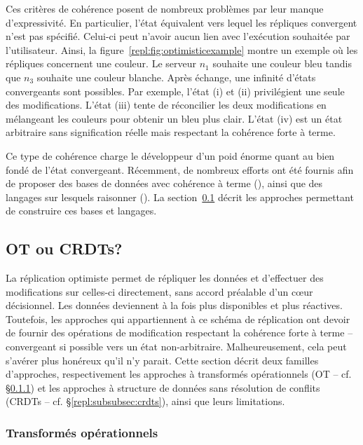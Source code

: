 Ces critères de cohérence posent de nombreux problèmes par leur manque
d'expressivité. En particulier, l'état équivalent vers lequel les répliques
convergent n'est pas spécifié. Celui-ci peut n'avoir aucun lien avec l'exécution
souhaitée par l'utilisateur. Ainsi, la figure~\ref{repl:fig:optimisticexample}
montre un exemple où les répliques concernent une couleur. Le serveur $n_1$
souhaite une couleur bleu tandis que $n_3$ souhaite une couleur blanche. Après
échange, une infinité d'états convergeants sont possibles. Par exemple, l'état
(i) et (ii) privilégient une seule des modifications. L'état (iii) tente de
réconcilier les deux modifications en mélangeant les couleurs pour obtenir un
bleu plus clair. L'état (iv) est un état arbitraire sans signification réelle
mais respectant la cohérence forte à terme.

Ce type de cohérence charge le développeur d'un poid énorme quant au bien fondé
de l'état convergeant.  Récemment, de nombreux efforts ont été fournis afin de
proposer des bases de données avec cohérence à terme (\REF), ainsi que des
langages sur lesquels raisonner (\REF). La section~\ref{repl:subsec:otorcrdts}
décrit les approches permettant de construire ces bases et langages.


\subsection{OT ou CRDTs?}
\label{repl:subsec:otorcrdts}

La réplication optimiste permet de répliquer les données et d'effectuer des
modifications sur celles-ci directement, sans accord préalable d'un cœur
décisionnel. Les données deviennent à la fois plus disponibles et plus
réactives. Toutefois, les approches qui appartiennent à ce schéma de réplication
ont devoir de fournir des opérations de modification respectant la cohérence
forte à terme -- convergeant si possible vers un état
non-arbitraire. Malheureusement, cela peut s'avérer plus honéreux qu'il n'y
parait. Cette section décrit deux familles d'approches, respectivement les
approches à transformés opérationnels (OT -- cf. §\ref{repl:subsubsec:ot}) et
les approches à structure de données sans résolution de conflits (CRDTs --
cf. §\ref{repl:subsubsec:crdts}), ainsi que leurs limitations.

\subsubsection{Transformés opérationnels}
\label{repl:subsubsec:ot}

